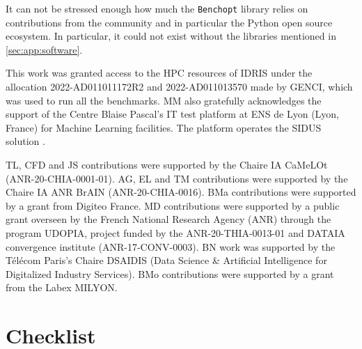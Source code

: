 \documentclass{article}
\newcommand{\Benchopt}{{{\texttt{Benchopt}}}}
\begin{document}
It can not be stressed enough how much the \Benchopt{} library relies on contributions from the community and in particular the Python open source ecosystem.
In particular, it could not exist without the libraries mentioned in \autoref{sec:app:software}.


This work was granted access to the HPC resources of IDRIS under the allocation 2022-AD011011172R2 and 2022-AD011013570 made by GENCI, which was used to run all the benchmarks.
MM also gratefully acknowledges the support of the Centre Blaise Pascal's IT test platform at ENS de Lyon (Lyon, France) for Machine Learning facilities.
The platform operates the SIDUS solution \citep{quemener2013sidus}.

TL, CFD and JS contributions were supported by the Chaire IA CaMeLOt (ANR-20-CHIA-0001-01).
AG, EL and TM contributions were supported by the Chaire IA ANR BrAIN (ANR-20-CHIA-0016).
BMa contributions were supported by a grant from Digiteo France.
MD contributions were supported by a public grant overseen by the French National Research Agency (ANR) through the program UDOPIA, project funded by the ANR-20-THIA-0013-01 and DATAIA convergence institute  (ANR-17-CONV-0003).
BN work was supported by the Télécom Paris's Chaire DSAIDIS (Data Science \& Artificial Intelligence for Digitalized Industry Services).
BMo contributions were supported by a grant from the Labex MILYON.
{
\setlength{}  \small
\printbibliography
}

\newpage
\section*{Checklist}
\end{document}
